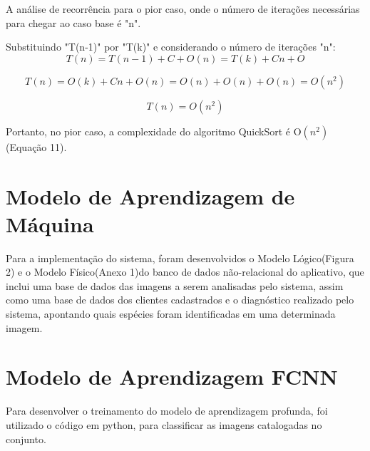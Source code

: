 \documentclass[
  a4paper,%
  12pt,%
  english,%
  brazilian,%
]{article}
\begin{document}
A análise de recorrência para o pior caso, onde o número de iterações necessárias para chegar ao caso base é "n".

Substituindo "T(n-1)" por "T(k)" e considerando o número de iterações "n":\\

\begin{equation} 
    \label{eu_eqn}
        T(n) = T(n-1) + C + O(n) = T(k) + Cn + O
\end{equation}

\begin{equation} 
    \label{eu_eqn}
        T(n) = O(k) + Cn + O(n) = O(n) + O(n) + O(n) = O(n^2)
\end{equation}

\begin{equation} 
    \label{eu_eqn}
        T(n) = O(n^2)
\end{equation}

Portanto, no pior caso, a complexidade do algoritmo QuickSort é O$(n^2)$(Equação 11).

\section*{Modelo de Aprendizagem de Máquina}
    Para a implementação do sistema, foram desenvolvidos o Modelo Lógico(Figura 2) e o Modelo Físico(Anexo 1)do banco de dados não-relacional do aplicativo, que inclui uma base de dados das imagens a serem analisadas pelo sistema, assim como uma base de dados dos clientes cadastrados e  o diagnóstico realizado pelo sistema, apontando quais espécies foram identificadas em uma determinada imagem.  

    
    
\section*{Modelo de Aprendizagem FCNN}

Para desenvolver o treinamento do modelo de aprendizagem profunda, foi utilizado o código em python, para classificar as imagens catalogadas no conjunto.
\end{document}
